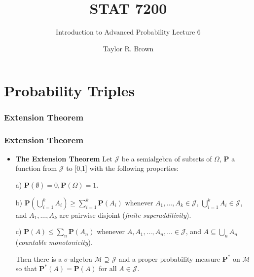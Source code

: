 \documentclass[handout]{beamer}
\title{STAT 7200}
\subtitle{Introduction to Advanced Probability \newline Lecture 6}
\author{Taylor R. Brown}
\institute{}
\date{}
\newcommand{\BP}{\mathbf{P}}
\begin{document}
\frame{\titlepage}

\section[Outline]{}


\section{Probability Triples}

\subsubsection{Extension Theorem}
\frame
{
  \frametitle{Extension Theorem}

   \begin{itemize}

             \item<1-> [] \begin{Theorem}[2.3.1.] \textbf{The Extension Theorem}  Let $\mathcal{J}$ be a semialgebra of subsets of $\Omega$,  $\mathbf{P}$ a function from $\mathcal{J}$  to [0,1] with the following properties:
             \newline
             
             a) $\mathbf{P} (\emptyset)=0, \mathbf{P}(\Omega)=1$.
                 \newline
         
             b) $\BP(\bigcup_{i=1}^k A_i)\geq \sum_{i=1}^k \BP(A_i)$ whenever $A_1,\ldots,A_k \in\mathcal{J}$, $\bigcup_{i=1}^k A_i  \in\mathcal{J}$, and $A_1,\ldots,A_k$ are pairwise disjoint (\textit{finite superadditivity}).
                   \newline
       
             c) $\BP(A)\leq \sum_{n} \BP(A_n)$ whenever $A,A_1,\ldots,A_n, \ldots \in\mathcal{J}$, and $A\subseteq \bigcup_{n} A_n$ (\textit{countable monotonicity}).               
             \newline
             
             Then there is a $\sigma$-algebra $\mathcal{M} \supseteq \mathcal{J}$ and a proper probability measure $\BP^*$ on $\mathcal{M}$ so that $\BP^*(A)=\BP(A)$ for all $A\in \mathcal{J}$.
             \end{Theorem}    
       
                
                 \end{itemize}
}
\end{document}
